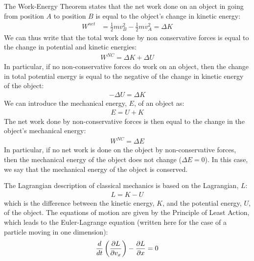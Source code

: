 \begin{chapterSummary}
The Work-Energy Theorem states that the net work done on an object in going from position $A$ to position $B$ is equal to the object's change in kinetic energy:
\begin{align*}
W^{net}&=\frac{1}{2}mv_B^2-\frac{1}{2}mv_A^2=\Delta K
\end{align*}
We can thus write that the total work done by non conservative forces is equal to the change in potential and kinetic energies:
\begin{align*}
W^{NC}=\Delta K+\Delta U
\end{align*}
In particular, if no non-conservative forces do work on an object, then the change in total potential energy is equal to the negative of the change in kinetic energy of the object:
\begin{align*}
-\Delta U=\Delta K
\end{align*}
We can introduce the mechanical energy, $E$, of an object as:
\begin{align*}
E = U+K
\end{align*}
The net work done by non-conservative forces is then equal to the change in the object's mechanical energy:
\begin{align*}
W^{NC}=\Delta E
\end{align*}
In particular, if no net work is done on the object by non-conservative forces, then the mechanical energy of the object does not change ($\Delta E=0$). In this case, we say that the mechanical energy of the object is conserved.

The Lagrangian description of classical mechanics is based on the Lagrangian, $L$:
\begin{align*}
L = K - U
\end{align*}
which is the difference between the kinetic energy, $K$, and the potential energy, $U$, of the object. The equations of motion are given by the Principle of Least Action, which leads to the Euler-Lagrange equation (written here for the case of a particle moving in one dimension):
\begin{align*}
\frac{d}{dt}\left(\frac{\partial L}{\partial v_x}\right)-\frac{\partial L}{\partial x} = 0
\end{align*}
\end{chapterSummary}

